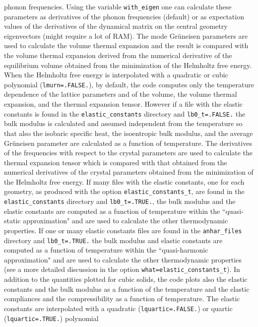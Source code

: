 \documentclass[12pt,a4paper,twoside]{report}
\begin{document}
phonon frequencies. Using the variable \texttt{with\_eigen} one can 
calculate these parameters as derivatives of the phonon frequencies 
(default) or as expectation values of the derivatives of the dynamical 
matrix on the central geometry eigenvectors (might require a lot of RAM). 
The mode Gr\"uneisen parameters are used to calculate the volume
thermal expansion and the result is compared with the volume thermal expansion
derived from the numerical derivative of the equilibrium volume obtained
from the minimization of the Helmholtz free energy. 
When the Helmholtz free energy is interpolated with a quadratic or cubic
polynomial (\texttt{lmurn=.FALSE.}), by default, the code computes only 
the temperature dependence of the lattice parameters and of the volume, the 
volume thermal expansion, and the thermal expansion tensor. However if a file 
with the elastic constants is found in the \texttt{elastic\_constants}
directory 
and \texttt{lb0\_t=.FALSE.} the bulk modulus is calculated and 
assumed independent from the temperature so that also the isobaric specific 
heat, the isoentropic bulk modulus, and the average Gr\"uneisen parameter 
are calculated as a function of temperature. The derivatives of the 
frequencies with respect to the crystal parameters are used to calculate 
the thermal expansion tensor which 
is compared with that obtained from the numerical derivatives of the 
crystal parameters obtained from the minimization of the Helmholtz free energy.
If many files with the elastic constants, one for each geometry, as
produced with the option \texttt{elastic\_constants\_t}, are found
in the \texttt{elastic\_constants} directory and \texttt{lb0\_t=.TRUE.}, the bulk modulus and 
the elastic constants
are computed as a function of temperature within the ``quasi-static
approximation" and are used
to calculate the other thermodynamic properties. 
If one or many elastic constants files are found in the 
\texttt{anhar\_files} directory and \texttt{lb0\_t=.TRUE.} the bulk modulus 
and elastic constants are computed as a function of temperature 
within the ``quasi-harmonic approximation" and are used
to calculate the other thermodynamic properties (see a more detailed
discussion in the option \texttt{what=elastic\_constants\_t}).
In addition to the
quantities plotted for cubic solids, the code plots also the elastic
constants and the bulk modulus as a function of the temperature and
the elastic compliances and the compressibility as a function of temperature.
The elastic constants are interpolated with a quadratic 
(\texttt{lquartic=.FALSE.}) or quartic (\texttt{lquartic=.TRUE.}) polynomial
\end{document}
